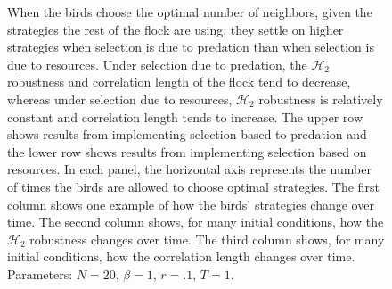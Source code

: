 \documentclass{article}
\begin{document}
\begin{figure}
\caption{\label{greedyopt} When the birds choose the optimal number of neighbors, given the strategies the rest of the flock are using, they settle on higher strategies when selection is due to predation than when selection is due to resources. Under selection due to predation, the $\mathscr{H}_2$ robustness and correlation length of the flock tend to decrease, whereas under selection due to resources, $\mathscr{H}_2$ robustness is relatively constant and correlation length tends to increase. The upper row shows results from implementing selection based to predation and the lower row shows results from implementing selection based on resources. In each panel, the  horizontal axis represents the number of times the birds are allowed to choose optimal strategies. The first column shows one example of how the birds' strategies change over time. The second column shows, for many initial conditions, how the $\mathscr{H}_2$ robustness changes over time. The third column shows, for many initial conditions, how the correlation length changes over time. Parameters:  $N=20$, $\beta=1$, $r=.1$, $T=1$. 
}
\end{figure}



\nocite{*}


\end{document}

